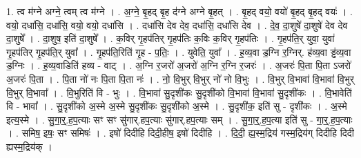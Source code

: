 \documentclass[17pt]{extarticle}
\begin{document}
1. त्व म॑ग्ने अग्ने॒ त्वम् त्व म॑ग्ने । . अ॒ग्ने॒ बृ॒हद् बृ॒ह द॑ग्ने अग्ने बृ॒हत् । . बृ॒हद् वयो॒ वयो॑ बृ॒हद् बृ॒हद् वयः॑ । . वयो॒ दधा॑सि॒ दधा॑सि॒ वयो॒ वयो॒ दधा॑सि । . दधा॑सि देव देव॒ दधा॑सि॒ दधा॑सि देव । . दे॒व॒ दा॒शुषे॑ दा॒शुषे॑ देव देव दा॒शुषे᳚ । . दा॒शुष॒ इति॑ दा॒शुषे᳚ । . क॒विर् गृ॒हप॑तिर् गृ॒हप॑तिः क॒विः क॒विर् गृ॒हप॑तिः । . गृ॒हप॑ति॒र् युवा॒ युवा॑ गृ॒हप॑तिर् गृ॒हप॑ति॒र् युवा᳚ । . गृ॒हप॑ति॒रिति॑ गृ॒ह - प॒तिः॒ । . युवेति॒ युवा᳚ । . ह॒व्य॒वा ड॒ग्नि र॒ग्निर्. ह॑व्य॒वा ड्ढ॑व्य॒वा ड॒ग्निः । . ह॒व्य॒वाडिति॑ हव्य - वाट् । . अ॒ग्नि र॒जरो॑ अ॒जरो॑ अ॒ग्नि र॒ग्नि र॒जरः॑ । . अ॒जरः॑ पि॒ता पि॒ता ऽजरो॑ अ॒जरः॑ पि॒ता । . पि॒ता नो॑ नः पि॒ता पि॒ता नः॑ । . नो॒ वि॒भुर् वि॒भुर् नो॑ नो वि॒भुः । . वि॒भुर् वि॒भावा॑ वि॒भावा॑ वि॒भुर् वि॒भुर् वि॒भावा᳚ । . वि॒भुरिति॑ वि - भुः । . वि॒भावा॑ सु॒दृशी॑कः सु॒दृशी॑को वि॒भावा॑ वि॒भावा॑ सु॒दृशी॑कः । . वि॒भावेति॑ वि - भावा᳚ । . सु॒दृशी॑को अ॒स्मे अ॒स्मे सु॒दृशी॑कः सु॒दृशी॑को अ॒स्मे । . सु॒दृशी॑क॒ इति॑ सु - दृशी॑कः । . अ॒स्मे इत्य॒स्मे । . सु॒गा॒र्॒.ह॒प॒त्याः सꣳ सꣳ सु॑गार्.हप॒त्याः सु॑गार्.हप॒त्याः सम् । . सु॒गा॒र्॒.ह॒प॒त्या इति॑ सु - गा॒र्॒.ह॒प॒त्याः । . समिष॒ इषः॒ सꣳ समिषः॑ । . इषो॑ दिदीहि दिदी॒हीष॒ इषो॑ दिदीहि । . दि॒दी॒ ह्य॒स्म॒द्रिय॑ गस्म॒द्रिय॑ग् दिदीहि दिदी ह्यस्म॒द्रिय॑क् । \newline
\end{document}
